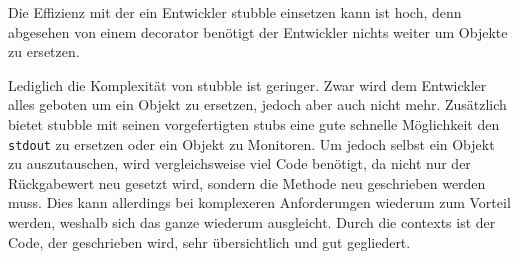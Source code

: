 Die Effizienz mit der ein Entwickler stubble einsetzen kann ist hoch, denn
abgesehen von einem \gls{decorator} benötigt der Entwickler nichts weiter um
Objekte zu ersetzen.

Lediglich die Komplexität von stubble ist geringer. Zwar wird dem Entwickler
alles geboten um ein Objekt zu ersetzen, jedoch aber auch nicht mehr.
Zusätzlich bietet stubble mit seinen vorgefertigten \Glspl{stub} eine gute
schnelle Möglichkeit den \lstinline{stdout} zu ersetzen oder ein Objekt zu
Monitoren. Um jedoch selbst ein Objekt zu auszutauschen, wird vergleichsweise
viel Code benötigt, da nicht nur der Rückgabewert neu gesetzt wird,
sondern die Methode neu geschrieben werden muss. Dies kann allerdings bei
komplexeren Anforderungen wiederum zum Vorteil werden, weshalb sich das ganze
wiederum ausgleicht. Durch die \Glspl{context} ist der Code, der geschrieben
wird, sehr übersichtlich und gut gegliedert.